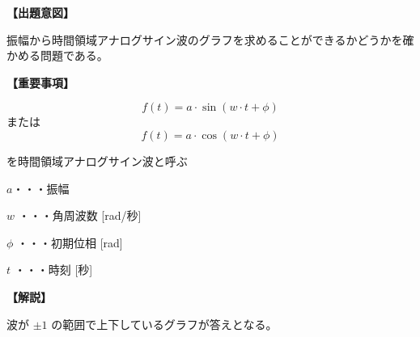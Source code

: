 \noindent \textbf{【出題意図】}

\noindent 振幅から時間領域アナログサイン波のグラフを求めることができるかどうかを確かめる問題である。

\vspace{1em}
\noindent \textbf{【重要事項】}

\[
f(t) = a \cdot \sin( w \cdot t + \phi )
\]
%
\noindent または
%
\[
f(t) = a \cdot \cos( w \cdot t + \phi )
\]

\medskip
\noindent を時間領域アナログサイン波と呼ぶ

\bigskip
\noindent $a$・・・振幅

\bigskip
\noindent $w$ ・・・角周波数 [rad/秒]

\bigskip
\noindent $\phi$ ・・・初期位相 [rad]

\bigskip
\noindent $t$ ・・・時刻 [秒]

\vspace{1em}
\noindent \textbf{【解説】}

\noindent 波が $\pm 1$ の範囲で上下しているグラフが答えとなる。

